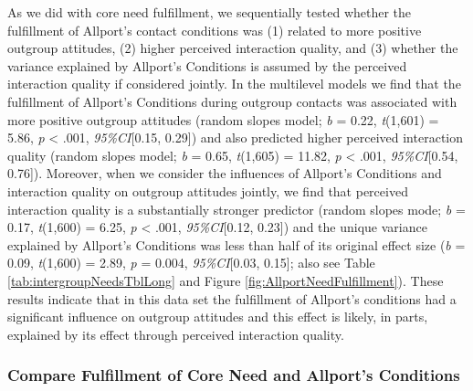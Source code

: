 As we did with core need fulfillment, we sequentially tested whether the
fulfillment of Allport's contact conditions was (1) related to more
positive outgroup attitudes, (2) higher perceived interaction quality,
and (3) whether the variance explained by Allport's Conditions is
assumed by the perceived interaction quality if considered jointly. In
the multilevel models we find that the fulfillment of Allport's
Conditions during outgroup contacts was associated with more positive
outgroup attitudes (random slopes model; \textit{b} = 0.22,
\textit{t}(1,601) = 5.86, \textit{p} \textless{} .001,
\textit{95\%CI}{[}0.15, 0.29{]}) and also predicted higher perceived
interaction quality (random slopes model; \textit{b} = 0.65,
\textit{t}(1,605) = 11.82, \textit{p} \textless{} .001,
\textit{95\%CI}{[}0.54, 0.76{]}). Moreover, when we consider the
influences of Allport's Conditions and interaction quality on outgroup
attitudes jointly, we find that perceived interaction quality is a
substantially stronger predictor (random slopes mode; \textit{b} = 0.17,
\textit{t}(1,600) = 6.25, \textit{p} \textless{} .001,
\textit{95\%CI}{[}0.12, 0.23{]}) and the unique variance explained by
Allport's Conditions was less than half of its original effect size
(\textit{b} = 0.09, \textit{t}(1,600) = 2.89, \textit{p} = 0.004,
\textit{95\%CI}{[}0.03, 0.15{]}; also see Table
\ref{tab:intergroupNeedsTblLong} and Figure
\ref{fig:AllportNeedFulfillment}). These results indicate that in this
data set the fulfillment of Allport's conditions had a significant
influence on outgroup attitudes and this effect is likely, in parts,
explained by its effect through perceived interaction quality.

\subsubsection{Compare Fulfillment of Core Need and Allport's Conditions}

